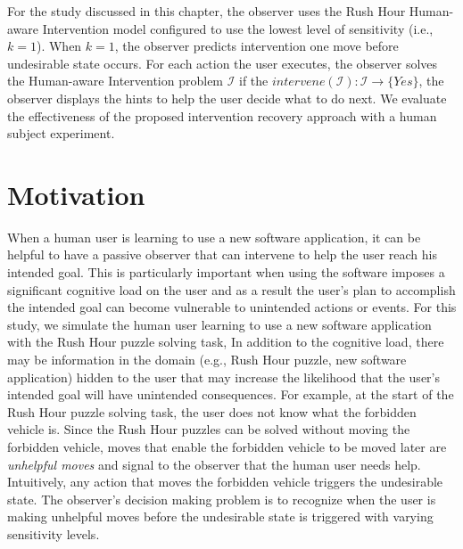 For the study discussed in this chapter, the observer uses the Rush Hour Human-aware Intervention model configured to use the lowest level of sensitivity (i.e., $k=1$).
When $k=1$, the observer predicts intervention one move before undesirable state occurs.
For each action the user executes, the observer solves the Human-aware Intervention problem $\mathcal{I}$ if the $intervene (\mathcal{I}) :  \mathcal{I} \rightarrow \{Yes\} $, the observer displays the hints to help the user decide what to do next.
We evaluate the effectiveness of the proposed intervention recovery approach with a human subject experiment.


\section{Motivation}
When a human user is learning to use a new software application, it can be helpful to have a passive observer that can intervene to help the user reach his intended goal. 
This is particularly important when using the software imposes a significant cognitive load on the user and as a result the user's plan to accomplish the intended goal can become vulnerable to unintended actions or events.
For this study, we simulate the human user learning to use a new software application with the Rush Hour puzzle solving task, 
In addition to the cognitive load, there may be information in the domain (e.g., Rush Hour puzzle, new software application) hidden to the user that may increase the likelihood that the user's intended goal will have unintended consequences. 
For example, at the start of the Rush Hour puzzle solving task, the user does not know what the forbidden vehicle is.
Since the Rush Hour puzzles can be solved without moving the forbidden vehicle, moves that enable the forbidden vehicle to be moved later are \textit{unhelpful moves} and signal to the observer that the human user needs help. 
Intuitively, any action that moves the forbidden vehicle triggers the undesirable state.
The observer's decision making problem is to recognize when the user is making unhelpful moves before the undesirable state is triggered with varying sensitivity levels.


